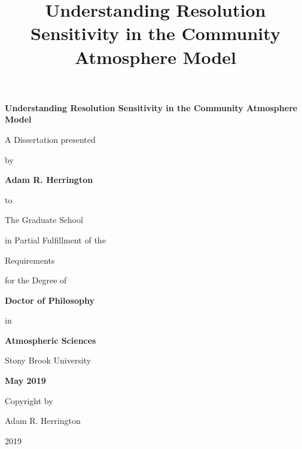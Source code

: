 \documentclass[12pt]{article}
\begin{document}
\title{\bf{Understanding Resolution Sensitivity in the Community Atmosphere Model}}

\vspace*{3\baselineskip}
\centerline{\bf{Understanding Resolution Sensitivity in the Community Atmosphere Model}}
\vspace*{1\baselineskip}
\centerline{A Dissertation presented}
\vspace*{1\baselineskip}
\centerline{by} 
\vspace*{1\baselineskip}
\centerline{\bf{Adam R. Herrington}}
\vspace*{1\baselineskip}
\centerline{to} 
\vspace*{1\baselineskip}
\centerline{The Graduate School}
\vspace*{1\baselineskip}
\centerline{in Partial Fulfillment of the}
\vspace*{1\baselineskip}
\centerline{Requirements}
\vspace*{1\baselineskip}
\centerline{for the Degree of}
\vspace*{1\baselineskip}
\centerline{\bf{Doctor of Philosophy}}
\vspace*{1\baselineskip}
\centerline{in}
\vspace*{1\baselineskip}
\centerline{\bf{Atmospheric Sciences}}
\vspace*{2\baselineskip}
\centerline{Stony Brook University}
\vspace*{2\baselineskip}
\centerline{\bf{May 2019}}     

\newpage
{}

\vspace*{32\baselineskip}
\vspace*{1\baselineskip}
\centerline{Copyright by}
\centerline{Adam R. Herrington}
\centerline{2019}

\newpage
{}
\setcounter{page}{2}
\end{document}
